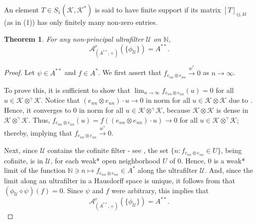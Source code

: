 \documentclass[a4]{amsart}
\theoremstyle{cupthm}
\newtheorem{thm}{Theorem}[section]
\theoremstyle{cupdefn}
\theoremstyle{cuprem}
\numberwithin{equation}{section}
\newcommand{\obp}{\otimes^{\gamma}}
\newcommand{\N}{\mathbb N}
\newcommand{\mK}{\mathcal{K}}
\begin{document}
An element $T \in S_1(\mK,\mK^*)$ is said to have finite support if its
matrix $[T]_{ij, kl}$ (as in (1)) has only finitely many non-zero entries.
\begin{thm}\label{ann-diamond}
	For any non-principal ultrafilter $\mathcal U$ on $\mathbb
        N $,
        $$
        \mathcal{A}^r_{(A^{**},\diamond)}\left(\{\phi_{\mathcal
          U}\}\right)=A^{**}.
        $$
\end{thm}

\begin{proof}
Let $\psi \in A^{**}$ and $f \in A^*$. We first assert that
        $f_{ e_{nn}\otimes e_{nn}}\stackrel{w^*}{\longrightarrow} 0$ as $n \to \infty$.\smallskip

 To prove this, it is sufficient to show that $\lim_{n\to \infty}f_{
   e_{nn}\otimes e_{nn}}(u) = 0$ for all $u \in \mK \obp \mK$. Notice
 that $(e_{nn}\otimes e_{nn})\cdot u\to 0$ in norm for all $u\in
 \mathcal K\otimes\mathcal K$ due to . Hence, it
 converges to $0$ in norm for all $u\in \mathcal K\obp\mathcal K$,
 because $\mathcal K\otimes \mathcal K$ is dense in $\mathcal K
 \obp\mathcal K$. Thus, $f_{e_{nn}\otimes e_{nn}}(u)=f((e_{nn}\otimes
 e_{nn})\cdot u)\to 0$ for all $u\in \mathcal K\obp\mathcal K$; thereby, implying that
 $f_{e_{nn}\otimes e_{nn}}\stackrel{w^*}{\longrightarrow}0$.

Next, since $\mathcal U$ contains the cofinite filter - see
, the set $\{n : f_{e_{nn}\otimes e_{nn}}\in
U\}$, being cofinite, is in $\mathcal U$, for each weak* open
neighborhood $U$ of $0$. Hence, $0$ is a weak* limit of the function
$\N \ni n \mapsto f_{e_{nn}\otimes e_{nn}}\in A^*$ along the
ultrafilter $\mathcal U$.  And, since the limit along an ultrafilter
in a Hausdorff space is unique, it follows from  that
$(\phi_{\mathcal U}\diamond \psi)(f)=0$.  Since $\psi$ and $f$ were
arbitrary, this implies that
	$$\mathcal{A}^r_{(A^{**},\diamond)}(\{\phi_{\mathcal
  U}\})=A^{**}.$$
\end{proof}
\end{document}
